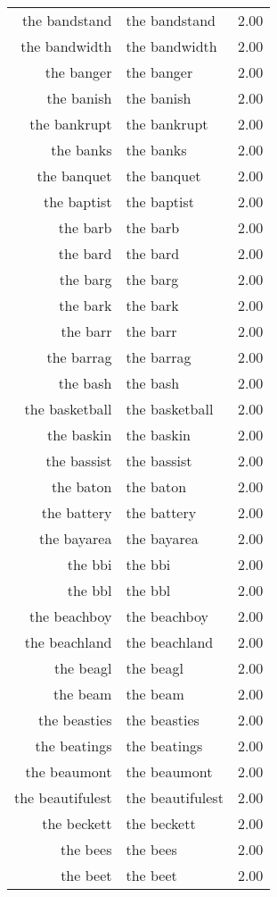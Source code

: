\begin{table}[ht]
\begin{tabular}{rlr}
  the bandstand & the bandstand & 2.00 \\ 
  the bandwidth & the bandwidth & 2.00 \\ 
  the banger & the banger & 2.00 \\ 
  the banish & the banish & 2.00 \\ 
  the bankrupt & the bankrupt & 2.00 \\ 
  the banks & the banks & 2.00 \\ 
  the banquet & the banquet & 2.00 \\ 
  the baptist & the baptist & 2.00 \\ 
  the barb & the barb & 2.00 \\ 
  the bard & the bard & 2.00 \\ 
  the barg & the barg & 2.00 \\ 
  the bark & the bark & 2.00 \\ 
  the barr & the barr & 2.00 \\ 
  the barrag & the barrag & 2.00 \\ 
  the bash & the bash & 2.00 \\ 
  the basketball & the basketball & 2.00 \\ 
  the baskin & the baskin & 2.00 \\ 
  the bassist & the bassist & 2.00 \\ 
  the baton & the baton & 2.00 \\ 
  the battery & the battery & 2.00 \\ 
  the bayarea & the bayarea & 2.00 \\ 
  the bbi & the bbi & 2.00 \\ 
  the bbl & the bbl & 2.00 \\ 
  the beachboy & the beachboy & 2.00 \\ 
  the beachland & the beachland & 2.00 \\ 
  the beagl & the beagl & 2.00 \\ 
  the beam & the beam & 2.00 \\ 
  the beasties & the beasties & 2.00 \\ 
  the beatings & the beatings & 2.00 \\ 
  the beaumont & the beaumont & 2.00 \\ 
  the beautifulest & the beautifulest & 2.00 \\ 
  the beckett & the beckett & 2.00 \\ 
  the bees & the bees & 2.00 \\ 
  the beet & the beet & 2.00 \\ 

\end{tabular}
\end{table}
